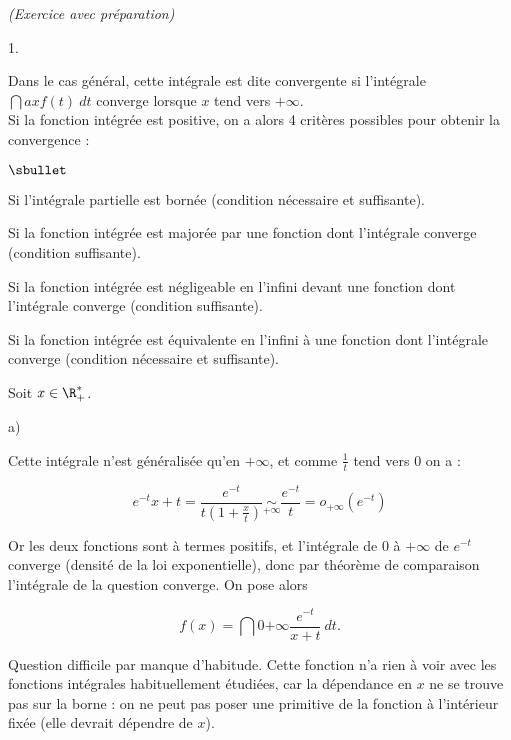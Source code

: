 \documentclass[11pt]{article}%
\begin{document}
 \begin{exercice}{\it (Exercice avec préparation)}~
 \begin{noliste}{1.}
 \setlength{\itemsep}{4mm}
 \item Dans le cas général, cette intégrale est dite convergente si
l'intégrale $\dint{a}{x} f(t) \ dt $ converge lorsque $x$ tend vers $ +
\infty$. \\

 Si la fonction intégrée est positive, on a alors 4 critères possibles
pour obtenir la convergence : \\
\begin{noliste}{$\sbullet$}

 \item Si l'intégrale partielle est bornée (condition nécessaire et
suffisante). 

 \item Si la fonction intégrée est majorée par une fonction dont
l'intégrale converge (condition suffisante).

 \item Si la fonction intégrée est négligeable en l'infini devant une
fonction dont l'intégrale converge (condition suffisante).

 \item Si la fonction intégrée est équivalente en l'infini à une
fonction dont l'intégrale converge (condition nécessaire et
suffisante).

 \end{noliste}

 \item Soit $x \in \R_+^*$. \begin{noliste}{a)}
 \setlength{\itemsep}{2mm}

 \item Cette intégrale n'est généralisée qu'en $ + \infty$, et comme $
\frac{ 1 }{ t }$ tend vers 0 on a : 
 
\[
 e^{ -t }{ x + t } = \frac{ e^{-t} }{ t \left( 1 + \frac{ x }{ t }
\right) } \underset{ + \infty }{ \sim } \frac{ e^{ - t } }{ t } = o_{ +
\infty } ( e^{ - t } ) 
\]

 Or les deux fonctions sont à termes positifs, et l'intégrale de 0 à $
+ \infty$ de $e^{-t}$ converge (densité de la loi exponentielle), donc
par théorème de comparaison l'intégrale de la question converge. On
pose alors 
 
\[
 f(x) = \dint{0}{ + \infty } \frac{ e^{ - t } }{ x + t } \ dt. 
\]

 \item Question difficile par manque d'habitude. Cette fonction n'a
rien à voir avec les fonctions intégrales habituellement étudiées, car
la dépendance en $x$ ne se trouve pas sur la borne : on ne peut pas
poser une primitive de la fonction à l'intérieur fixée (elle devrait
dépendre de $x$). \\


\end{noliste}
\end{noliste}
\end{exercice}
\end{document}
